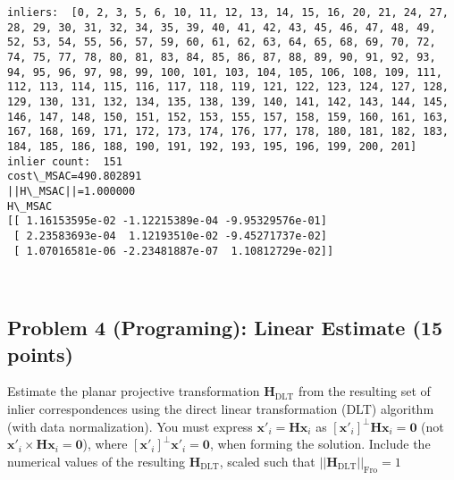 \documentclass[11pt]{article}
\begin{document}
    \begin{Verbatim}[commandchars=\\\{\}]
inliers:  [0, 2, 3, 5, 6, 10, 11, 12, 13, 14, 15, 16, 20, 21, 24, 27, 28, 29, 30, 31, 32, 34, 35, 39, 40, 41, 42, 43, 45, 46, 47, 48, 49, 52, 53, 54, 55, 56, 57, 59, 60, 61, 62, 63, 64, 65, 68, 69, 70, 72, 74, 75, 77, 78, 80, 81, 83, 84, 85, 86, 87, 88, 89, 90, 91, 92, 93, 94, 95, 96, 97, 98, 99, 100, 101, 103, 104, 105, 106, 108, 109, 111, 112, 113, 114, 115, 116, 117, 118, 119, 121, 122, 123, 124, 127, 128, 129, 130, 131, 132, 134, 135, 138, 139, 140, 141, 142, 143, 144, 145, 146, 147, 148, 150, 151, 152, 153, 155, 157, 158, 159, 160, 161, 163, 167, 168, 169, 171, 172, 173, 174, 176, 177, 178, 180, 181, 182, 183, 184, 185, 186, 188, 190, 191, 192, 193, 195, 196, 199, 200, 201]
inlier count:  151
cost\_MSAC=490.802891
||H\_MSAC||=1.000000
H\_MSAC
[[ 1.16153595e-02 -1.12215389e-04 -9.95329576e-01]
 [ 2.23583693e-04  1.12193510e-02 -9.45271737e-02]
 [ 1.07016581e-06 -2.23481887e-07  1.10812729e-02]]

    \end{Verbatim}

    \begin{center}
    \end{center}
    { \hspace*{\fill} \\}
    
    \subsection{Problem 4 (Programing): Linear Estimate (15
points)}\label{problem-4-programing-linear-estimate-15-points}

Estimate the planar projective transformation
\(\boldsymbol{H}_\text{DLT}\) from the resulting set of inlier
correspondences using the direct linear transformation (DLT) algorithm
(with data normalization). You must express
\(\boldsymbol{x}'_i = \boldsymbol{H} \boldsymbol{x}_i\) as
\([\boldsymbol{x}'_i]^\perp \boldsymbol{H} \boldsymbol{x}_i = \boldsymbol{0}\)
(not
\(\boldsymbol{x}'_i \times \boldsymbol{H} \boldsymbol{x}_i = \boldsymbol{0}\)),
where \([\boldsymbol{x}'_i]^\perp \boldsymbol{x}'_i = \boldsymbol{0}\),
when forming the solution. Include the numerical values of the resulting
\(\boldsymbol{H}_\text{DLT}\), scaled such that
\(||\boldsymbol{H}_\text{DLT}||_\text{Fro} = 1\)
\end{document}
